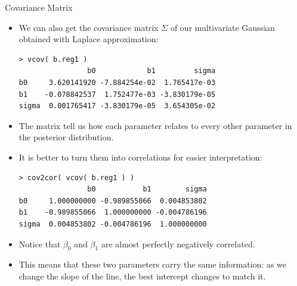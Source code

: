 \documentclass[handout]{beamer}
\begin{document}
\begin{frame}[fragile]{Covariance Matrix}
\scriptsize{
\begin{itemize}

\item We can also get the covariance matrix $\Sigma$ of our multivariate Gaussian obtained with Laplace approximation:

\begin{verbatim}
> vcov( b.reg1 )
                b0            b1         sigma
b0     3.620141920 -7.884254e-02  1.765417e-03
b1    -0.078842537  1.752477e-03 -3.830179e-05
sigma  0.001765417 -3.830179e-05  3.654305e-02 
\end{verbatim}


\item The matrix tell us  how each parameter relates to every other parameter in the posterior distribution.

\item It is better to turn them into correlations for easier interpretation:

\begin{verbatim}
> cov2cor( vcov( b.reg1 ) )
                b0           b1        sigma
b0     1.000000000 -0.989855066  0.004853802
b1    -0.989855066  1.000000000 -0.004786196
sigma  0.004853802 -0.004786196  1.000000000
\end{verbatim}

\item Notice that $\beta_0$ and $\beta_1$ are almost perfectly negatively correlated.

\item This means that these two parameters carry the same information: as we change the slope of the line, the best intercept changes to match it.


\end{itemize}
 

 
}
\end{frame}
\end{document}
